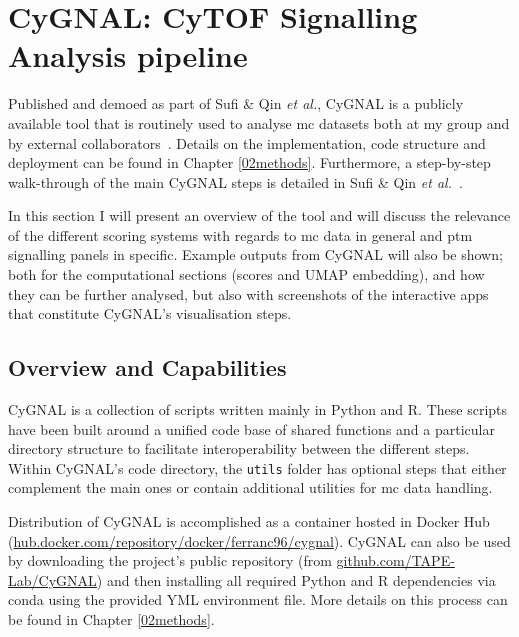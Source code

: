 \newpage
\section{CyGNAL: CyTOF Signalling Analysis pipeline}

Published and demoed as part of Sufi \& Qin \emph{et al.}, CyGNAL is a publicly available tool that is routinely used to analyse \acrshort{mc} datasets both at my group and by external collaborators~\cite{michelozzi_activation_2023}. Details on the implementation, code structure and deployment can be found in Chapter \ref{02methods}. Furthermore, a step-by-step walk-through of the main CyGNAL steps is detailed in Sufi \& Qin \textit{et al.}~\cite{sufi_multiplexed_2021}.

In this section I will present an overview of the tool and will discuss the relevance of the different scoring systems with regards to \acrshort{mc} data in general and \acrshort{ptm} signalling panels in specific. Example outputs from CyGNAL will also be shown; both for the computational sections (scores and UMAP embedding), and how they can be further analysed, but also with screenshots of the interactive apps that constitute CyGNAL's visualisation steps.

\subsection{Overview and Capabilities}

CyGNAL is a collection of scripts written mainly in Python and R. These scripts have been built around a unified code base of shared functions and a particular directory structure to facilitate interoperability between the different steps. 
Within CyGNAL's code directory, the \texttt{utils} folder has optional steps that either complement the main ones or contain additional utilities for \acrshort{mc} data handling. 

Distribution of CyGNAL is accomplished as a container hosted in Docker Hub (\href{https://hub.docker.com/repository/docker/ferranc96/cygnal}{hub.docker.com/repository/docker/ferranc96/cygnal}). CyGNAL can also be used by downloading the project's public repository (from \href{github.com/TAPE-Lab/CyGNAL}{github.com/TAPE-Lab/CyGNAL}) and then installing all required Python and R dependencies via conda using the provided YML environment file. More details on this process can be found in Chapter \ref{02methods}.

